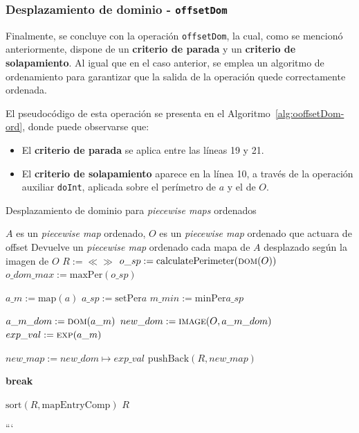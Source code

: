 \subsubsection{Desplazamiento de dominio - \texttt{offsetDom}}

Finalmente, se concluye con la operación \texttt{offsetDom}, la cual, como se mencionó anteriormente, dispone de un \textbf{criterio de parada} y un \textbf{criterio de solapamiento}. Al igual que en el caso anterior, se emplea un algoritmo de ordenamiento para garantizar que la salida de la operación quede correctamente ordenada.

El pseudocódigo de esta operación se presenta en el Algoritmo~\ref{alg:ooffsetDom-ord}, donde puede observarse que:

\begin{itemize}
    \item El \textbf{criterio de parada} se aplica entre las líneas 19 y 21.
    \item El \textbf{criterio de solapamiento} aparece en la línea 10, a través de la operación auxiliar \texttt{doInt}, aplicada sobre el perímetro de $a$ y el de $O$.
\end{itemize}



\begin{algorithm}
\caption{Desplazamiento de dominio para \textit{piecewise maps} ordenados}
\label{alg:ooffsetDom-ord}
\begin{algorithmic}[1]
\Require $A$ es un \textit{piecewise map} ordenado, $O$ es un \textit{piecewise map} ordenado que actuara de offset
\Ensure Devuelve un \textit{piecewise map} ordenado cada mapa de $A$ desplazado según la imagen de $O$
    \State $R := \ll\gg$
    \State $o\_sp := \mathrm{calculatePerimeter}(\Call{dom}{O})$
    \State $o\_dom\_max := \mathrm{maxPer}(o\_sp)$
    
        \State $a\_m :=\mathrm{map}(a)$
        \State $a\_sp := \mathrm{setPer}{a}$
        \State $m\_min :=\mathrm{minPer}{a\_sp}$

            \State $a\_m\_dom := \Call{dom}{a\_m}$
            \State $new\_dom := \Call{image}{O, a\_m\_dom}$
            \State $exp\_val := \Call{exp}{a\_m}$

                \State $new\_map := new\_dom \mapsto exp\_val$
                \State $\mathrm{pushBack}(R,new\_map)$ 
            \EndIf
        \EndIf

            \State \textbf{break} \EndIf
    \EndFor

    \State $\mathrm{sort}(R, \mathrm{mapEntryComp})$
    \State \Return $R$
\EndFunction
\end{algorithmic}
\end{algorithm}
```
